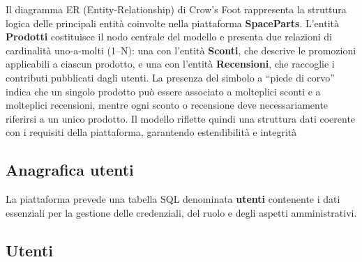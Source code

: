 \documentclass[a4paper,12pt]{report}
\begin{document}
Il diagramma ER (Entity-Relationship) di Crow’s Foot rappresenta la struttura logica delle principali 
entità coinvolte nella piattaforma \textbf{SpaceParts}. L’entità \textbf{Prodotti} costituisce 
il nodo centrale del modello e presenta due relazioni di cardinalità uno-a-molti (1–N): 
una con l’entità \textbf{Sconti}, che descrive le promozioni applicabili a ciascun prodotto, 
e una con l’entità \textbf{Recensioni}, che raccoglie i contributi pubblicati dagli utenti. 
La presenza del simbolo a “piede di corvo” indica che un singolo prodotto può essere 
associato a molteplici sconti e a molteplici recensioni, mentre ogni sconto o recensione 
deve necessariamente riferirsi a un unico prodotto. Il modello riflette quindi una struttura 
dati coerente con i requisiti della piattaforma, garantendo estendibilità e integrità 

\subsection{Anagrafica utenti}
\label{sec: anagrafica-utenti}

La piattaforma prevede una tabella SQL denominata \textbf{utenti} contenente i dati essenziali per la gestione delle credenziali, del ruolo e degli aspetti amministrativi.


\subsection*{Utenti}
\end{document}

